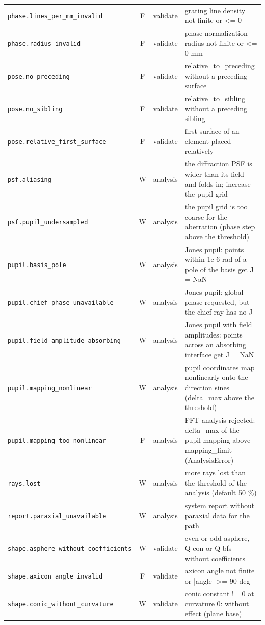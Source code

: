 \documentclass[11pt,a4paper,openany]{book}
\begin{document}
{\begin{longtable}{@{}L{6.1cm}cL{1.3cm}L{6.9cm}@{}}
\texttt{phase.lines\_per\_mm\_invalid} & F & validate & grating line density not finite or <= 0 \\
\texttt{phase.radius\_invalid} & F & validate & phase normalization radius not finite or <= 0 mm \\
\texttt{pose.no\_preceding} & F & validate & relative\_to\_preceding without a preceding surface \\
\texttt{pose.no\_sibling} & F & validate & relative\_to\_sibling without a preceding sibling \\
\texttt{pose.relative\_first\_surface} & F & validate & first surface of an element placed relatively \\
\texttt{psf.aliasing} & W & analysis & the diffraction PSF is wider than its field and folds in; increase the pupil grid \\
\texttt{psf.pupil\_undersampled} & W & analysis & the pupil grid is too coarse for the aberration (phase step above the threshold) \\
\texttt{pupil.basis\_pole} & W & analysis & Jones pupil: points within 1e-6 rad of a pole of the basis get J = NaN \\
\texttt{pupil.chief\_phase\_unavailable} & W & analysis & Jones pupil: global phase requested, but the chief ray has no J \\
\texttt{pupil.field\_amplitude\_absorbing} & W & analysis & Jones pupil with field amplitudes: points across an absorbing interface get J = NaN \\
\texttt{pupil.mapping\_nonlinear} & W & analysis & pupil coordinates map nonlinearly onto the direction sines (delta\_max above the threshold) \\
\texttt{pupil.mapping\_too\_nonlinear} & F & analysis & FFT analysis rejected: delta\_max of the pupil mapping above mapping\_limit (AnalysisError) \\
\texttt{rays.lost} & W & analysis & more rays lost than the threshold of the analysis (default 50 \%) \\
\texttt{report.paraxial\_unavailable} & W & analysis & system report without paraxial data for the path \\
\texttt{shape.asphere\_without\_coefficients} & W & validate & even or odd asphere, Q-con or Q-bfs without coefficients \\
\texttt{shape.axicon\_angle\_invalid} & F & validate & axicon angle not finite or |angle| >= 90 deg \\
\texttt{shape.conic\_without\_curvature} & W & validate & conic constant != 0 at curvature 0: without effect (plane base) \\

\end{longtable}}
\end{document}
